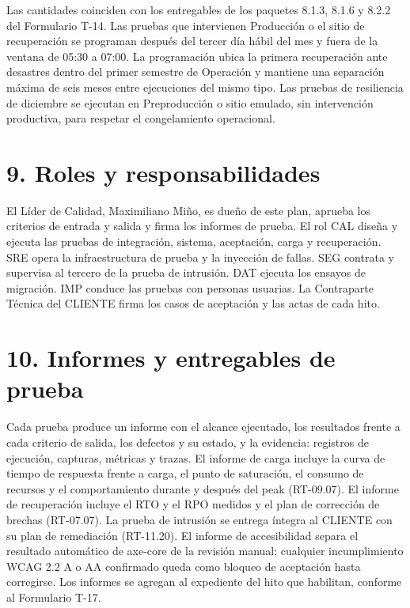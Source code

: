 Las cantidades coinciden con los entregables de los paquetes 8.1.3, 8.1.6 y 8.2.2 del Formulario T-14. Las pruebas que intervienen Producción o el sitio de recuperación se programan después del tercer día hábil del mes y fuera de la ventana de 05:30 a 07:00. La programación ubica la primera recuperación ante desastres dentro del primer semestre de Operación y mantiene una separación máxima de seis meses entre ejecuciones del mismo tipo. Las pruebas de resiliencia de diciembre se ejecutan en Preproducción o sitio emulado, sin intervención productiva, para respetar el congelamiento operacional.

\section*{9. Roles y responsabilidades}

El Líder de Calidad, Maximiliano Miño, es dueño de este plan, aprueba los criterios de entrada y salida y firma los informes de prueba. El rol CAL diseña y ejecuta las pruebas de integración, sistema, aceptación, carga y recuperación. SRE opera la infraestructura de prueba y la inyección de fallas. SEG contrata y supervisa al tercero de la prueba de intrusión. DAT ejecuta los ensayos de migración. IMP conduce las pruebas con personas usuarias. La Contraparte Técnica del CLIENTE firma los casos de aceptación y las actas de cada hito.

\section*{10. Informes y entregables de prueba}

Cada prueba produce un informe con el alcance ejecutado, los resultados frente a cada criterio de salida, los defectos y su estado, y la evidencia: registros de ejecución, capturas, métricas y trazas. El informe de carga incluye la curva de tiempo de respuesta frente a carga, el punto de saturación, el consumo de recursos y el comportamiento durante y después del peak (RT-09.07). El informe de recuperación incluye el RTO y el RPO medidos y el plan de corrección de brechas (RT-07.07). La prueba de intrusión se entrega íntegra al CLIENTE con su plan de remediación (RT-11.20). El informe de accesibilidad separa el resultado automático de axe-core de la revisión manual; cualquier incumplimiento WCAG 2.2 A o AA confirmado queda como bloqueo de aceptación hasta corregirse. Los informes se agregan al expediente del hito que habilitan, conforme al Formulario T-17.

